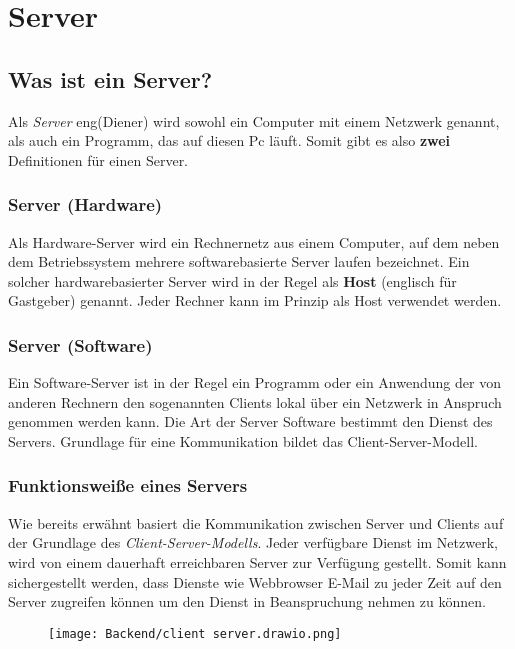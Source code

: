 \section{Server}
\label{server}

\subsection{Was ist ein Server?}
Als \textit{Server} eng(Diener) wird sowohl ein Computer mit einem Netzwerk genannt,
als auch ein Programm, das auf diesen Pc läuft. Somit gibt es also \textbf{zwei} Definitionen
für einen Server.

\subsubsection{Server (Hardware)}
Als Hardware-Server wird ein Rechnernetz aus einem Computer, auf dem neben dem Betriebssystem
mehrere softwarebasierte Server laufen bezeichnet. Ein solcher hardwarebasierter
Server wird in der Regel als \textbf{Host} (englisch für Gastgeber) genannt. Jeder Rechner kann
im Prinzip als Host verwendet
werden.

\subsubsection{Server (Software)}
Ein Software-Server ist in der Regel ein Programm oder ein Anwendung
der von anderen Rechnern den sogenannten Clients lokal über ein Netzwerk in Anspruch genommen
werden kann. Die Art der Server Software bestimmt den Dienst des Servers. Grundlage für
eine Kommunikation bildet das Client-Server-Modell. \underline{}

\subsubsection{Funktionsweiße eines Servers}
Wie bereits erwähnt basiert die Kommunikation zwischen Server und Clients
auf der Grundlage des \textit{Client-Server-Modells}. Jeder verfügbare Dienst im Netzwerk, wird von
einem dauerhaft erreichbaren Server zur Verfügung gestellt. Somit kann sichergestellt werden, dass
Dienste wie Webbrowser E-Mail zu jeder Zeit auf den Server zugreifen können um den Dienst
in Beanspruchung nehmen zu können.

\begin{figure}[H]
    \centering
    \texttt{[image: Backend/client server.drawio.png]}
\end{figure}
